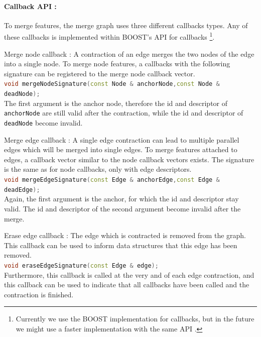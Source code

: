 \paragraph{Callback API :}

To merge features, the merge graph uses three different callbacks types.
Any of these callbacks is implemented within BOOST's API for callbacks \citep{ boost_function}
\footnote{
Currently we use the BOOST implementation for callbacks, but 
in the future we might use a faster implementation with the same API  \citep{code_project_function}.
}.


\begin{compactitem}
\item Merge node callback :
    A contraction of an edge merges the two nodes of the edge
    into a single node.
    To merge node features, a callbacks with the following signature 
    can be registered to the merge node callback vector.
    \\
    \lstinline[language=c++]{void mergeNodeSignature(const Node & anchorNode,const Node & deadNode);}
    \\
    The first argument is the anchor node, therefore the id and descriptor of
    \lstinline{anchorNode} are still  valid after the contraction, while
    the  id and descriptor of \lstinline{deadNode} become invalid.


\item Merge edge callback :
    A single edge contraction can lead to multiple parallel edges
    which will be merged into single edges.
    To merge features attached to edges, a callback vector
    similar to the node callback vectors exists.
    The signature is the same as for node callbacks, only with 
    edge descriptors.
    \\
    \lstinline[language=c++]{void mergeEdgeSignature(const Edge & anchorEdge,const Edge & deadEdge);}
    \\
    Again, the first argument is the anchor, for which the id and descriptor stay valid.
    The id and descriptor of the second argument become invalid after the merge.

\item Erase edge callback :
    The edge which is contracted is removed from the graph.
    This callback can be used to inform data structures 
    that this edge has been removed.
    \\
    \lstinline[language=c++]{void eraseEdgeSignature(const Edge & edge);}
    \\
    Furthermore, this callback is called at the very and of each
    edge contraction, and this callback can be used
    to indicate that all callbacks have been called and
    the contraction is finished.

\end{compactitem}





